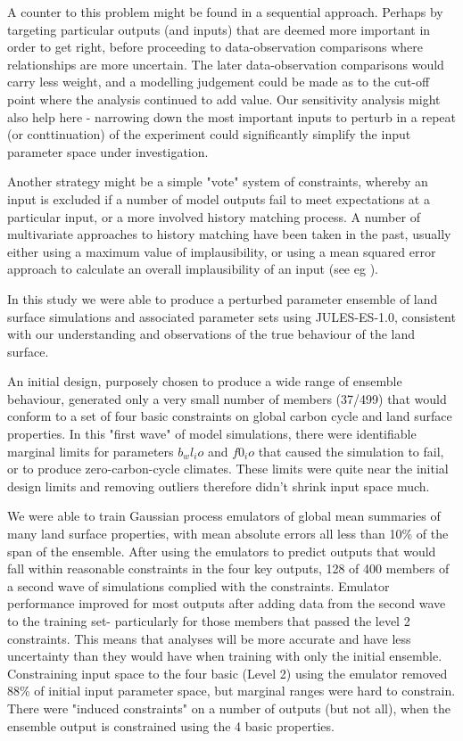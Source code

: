 \documentclass[gmd, manuscript]{copernicus}
\begin{document}
A counter to this problem might be found in a sequential approach. Perhaps by targeting particular outputs (and inputs) that are deemed more important in order to get right, before proceeding to data-observation comparisons where relationships are more uncertain. The later data-observation comparisons would carry less weight, and a modelling judgement could be made as to the cut-off point where the analysis continued to add value. Our sensitivity analysis might also help here - narrowing down the most important inputs to perturb in a repeat (or conttinuation) of the experiment could significantly simplify the input parameter space under investigation.

Another strategy might be a simple "vote" system of constraints, whereby an input is excluded if a number of model outputs fail to meet expectations at a particular input, or a more involved history matching process. A number of multivariate approaches to history matching have been taken in the past, usually either using a maximum value of implausibility, or using a mean squared error approach to calculate an overall implausibility of an input (see eg \cite{vernon2010galaxy}).

\label{sec:conclusions}  %

In this study we were able to produce a perturbed parameter ensemble of land surface simulations and associated parameter sets using JULES-ES-1.0, consistent with our understanding and observations of the true behaviour of the land surface. 

 An initial design, purposely chosen to produce a wide range of ensemble behaviour, generated only a very small number of members (37/499) that would conform to a set of four basic constraints on global carbon cycle and land surface properties. In this "first wave" of model simulations, there were identifiable marginal limits for parameters $b_wl_io$ and $f0_io$ that caused the simulation to fail, or to produce zero-carbon-cycle climates. These limits were quite near the initial design limits and removing outliers therefore didn't shrink input space much.
 
 We were able to train Gaussian process emulators of global mean summaries of many land surface properties, with mean absolute errors all less than 10\% of the span of the ensemble. After using the emulators to predict outputs that would fall within reasonable constraints in the four key outputs, 128 of 400 members of a second wave of simulations complied with the constraints. Emulator performance improved for most outputs after adding data from the  second wave to the training set- particularly for those members that passed the level 2 constraints. This means that analyses will be more accurate and have less uncertainty than they would have when training with only the initial ensemble. Constraining input space to the four basic (Level 2) using the emulator removed 88\% of initial input parameter space, but marginal ranges were hard to constrain. There were "induced constraints" on a number of outputs (but not all), when the ensemble output is constrained using the 4 basic properties.
    
\end{document}

